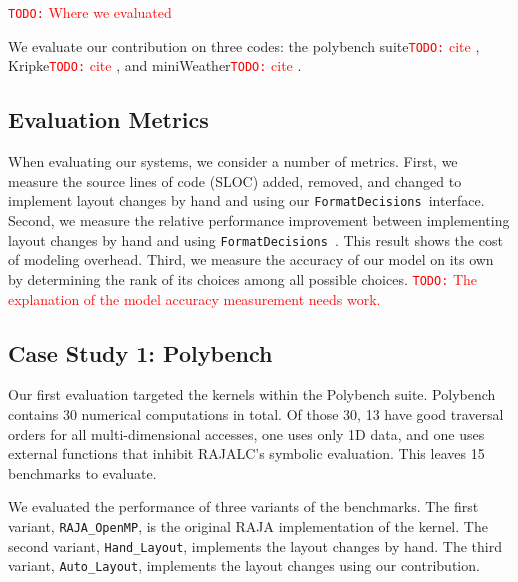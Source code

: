 \documentclass[sigconf, table]{acmart}
\newcommand{\todo}[1]{{\textcolor{red}{{\tt{TODO:}}\,\,#1 }}}
\newcommand{\nc}[0]{\todo{cite}}
\newcommand{\FormatDecisions}[0]{{\texttt{FormatDecisions}}~}
\begin{document}
\todo{Where we evaluated}

We evaluate our contribution on three codes: the polybench suite\nc, Kripke\nc, and miniWeather\nc.


\subsection{Evaluation Metrics}
When evaluating our systems, we consider a number of metrics. 
First,  we measure the source lines of code (SLOC) added, removed, and changed to implement layout changes by hand and using our \FormatDecisions interface.
Second, we measure the relative performance improvement between implementing layout changes by hand and using \FormatDecisions. 
This result shows the cost of modeling overhead.
Third, we measure the accuracy of our model on its own by determining the rank of its choices among all possible choices.
\todo{The explanation of the model accuracy measurement needs work.} 

\subsection{Case Study 1: Polybench}

Our first evaluation targeted the kernels within the Polybench suite. 
Polybench contains 30 numerical computations in total. 
Of those 30, 13 have good traversal orders for all multi-dimensional accesses, one uses only 1D data, and one uses external functions that inhibit RAJALC's symbolic evaluation.
This leaves 15 benchmarks to evaluate.

We evaluated the performance of three variants of the benchmarks.
The first variant, \verb.RAJA_OpenMP., is the original RAJA implementation of the kernel.
The second variant, \verb.Hand_Layout., implements the layout changes by hand.
The third variant, \verb.Auto_Layout., implements the layout changes using our contribution.
\end{document}
